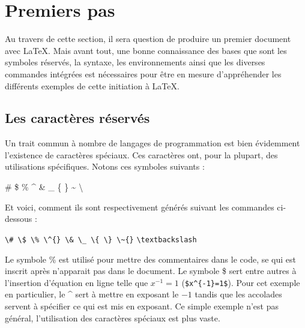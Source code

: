 \section*{Premiers pas}
Au travers de cette section, il sera question de produire un premier document avec \LaTeX. Mais avant tout, une bonne connaissance des bases que sont les symboles réservés, la syntaxe, les environnements ainsi que les diverses commandes intégrées est nécessaires pour être en mesure d'appréhender les différents exemples de cette initiation à \LaTeX.
%	
\subsection{Les caractères réservés}
Un trait commun à nombre de langages de programmation est bien évidemment l'existence de caractères spéciaux. Ces caractères ont, pour la plupart, des utilisations spécifiques. Notons ces symboles suivants :
%	
\begin{center}
	\# \$ \% \^{} \& \_ \{ \} \~{}  \textbackslash
\end{center}
%
\par Et voici, comment ils sont respectivement générés suivant les commandes ci-dessous :
\begin{flushleft}\label{lst:Caratères réservés}
	\verb|\# \$ \% \^{} \& \_ \{ \} \~{}|
	\verb|\textbackslash|
\end{flushleft}
%
Le symbole \% est utilisé pour mettre des commentaires dans le code, se qui est inscrit après n'apparait pas dans le document. Le symbole \$ sert entre autres à l'insertion d'équation en ligne telle que $x^{-1}=1$ (\verb|$x^{-1}=1$|). Pour cet exemple en particulier, le \^{} sert à mettre en exposant le $-1$ tandis que les accolades servent à spécifier ce qui est mis en exposant. Ce simple exemple n'est pas général, l'utilisation des caractères spéciaux est plus vaste.
%
